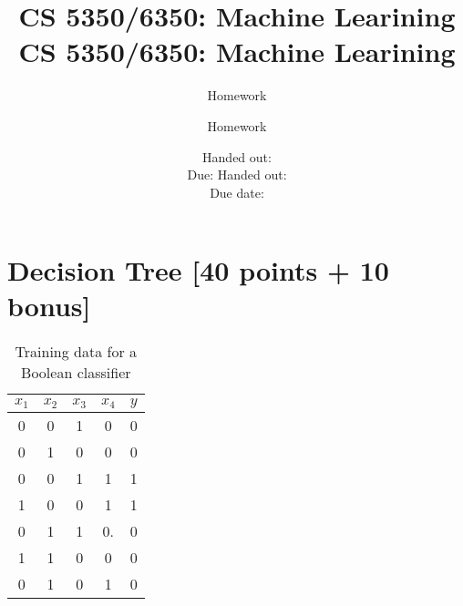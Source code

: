\documentclass[12pt, fullpage,letterpaper]{article}
\title{CS 5350/6350: Machine Learining \semester}
\author{Homework \assignmentId}
\date{Handed out: \releaseDate\\
	Due: \dueDate}
\title{CS 5350/6350: Machine Learining \semester}
\author{Homework \assignmentId}
\date{Handed out: \releaseDate\\
  Due date: \dueDate}
\begin{document}
\maketitle




\section{Decision Tree [40 points + 10 bonus]}
\begin{table}[h]
	\centering
	\begin{tabular}{cccc|c}
		$x_1$ & $x_2$ & $x_3$ & $x_4$ & $y$\\ 
		\hline\hline
		0 & 0 & 1 & 0 & 0 \\ \hline
		0 & 1 & 0 & 0 & 0 \\ \hline
		0 & 0 & 1 & 1 & 1 \\ \hline
		1 & 0 & 0 & 1 & 1 \\ \hline
		0 & 1 & 1 & 0.& 0\\ \hline
		1 & 1 & 0 & 0 & 0\\ \hline
		0 & 1 & 0 & 1 & 0\\ \hline
	\end{tabular}
	\caption{Training data for a Boolean classifier}
\end{table}
\end{document}
